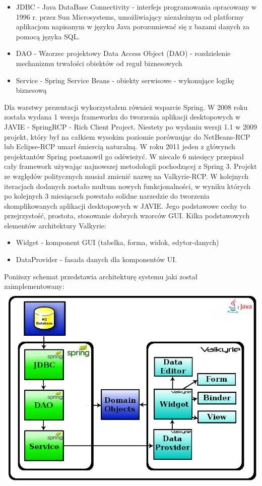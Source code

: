\begin{itemize}
 \item JDBC - Java DataBase Connectivity - interfejs programowania opracowany w 1996 r. przez Sun Microsystems, umożliwiający niezależnym od platformy aplikacjom napisanym w języku Java porozumiewać się z bazami danych za pomocą języka SQL.
 \item DAO - Wzorzec projektowy Data Access Object (DAO) - rozdzielenie mechanizmu trwałości obiektów od reguł biznesowych
 \item Service - Spring Service Beans - obiekty serwisowe - wykonujące logikę biznesową
\end{itemize}

Dla warstwy prezentacji wykorzystałem również wsparcie Spring. W 2008 roku została wydana 1 wersja frameworku do tworzenia aplikacji desktopowych w JAVIE - SpringRCP - Rich Client Project. Niestety po wydaniu wersji 1.1 w 2009 projekt, który był na całkiem wysokim poziomie porównując do NetBeans-RCP lub Eclipse-RCP umarł śmiercią naturalną. W roku 2011 jeden z główynch projektantów Spring postanowił go odświeżyć. W niecałe 6 miesięcy przepisał cały framework używając najnowszej metodologii pochodzącej z Spring 3. Projekt ze względów politycznych musiał zmienić nazwę na Valkyrie-RCP. W kolejnych iteracjach dodanych zostało multum nowych funkcjonalności, w wyniku których po kolejnych 3 miesiącach powstało solidne narzedzie do tworzenia skomplikowanych aplikacji desktopowych w JAVIE. Jego podstawowe cechy to przejrzystość, prostota, stosowanie dobrych wzorców GUI. Kilka podstawowych elementów architektury Valkyrie:
\begin{itemize}
 \item Widget - komponent GUI (tabelka, forma, widok, edytor-danych)
 \item DataProvider - fasada danych dla komponentów UI.
\end{itemize}
Poniższy schemat przedstawia architekturę systemu jaki został zaimplementowany:
\includegraphics[scale=0.31]{images/spring-layers2}

